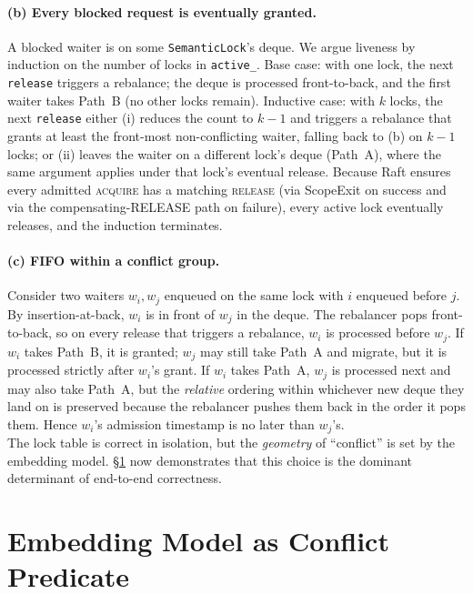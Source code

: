 \documentclass[sigconf]{acmart}
\begin{document}
\paragraph{\textbf{(b) Every blocked request is eventually granted.}}
A blocked waiter is on some \texttt{SemanticLock}'s deque. We argue
liveness by induction on the number of locks in \texttt{active\_}.
Base case: with one lock, the next \texttt{release} triggers a
rebalance; the deque is processed front-to-back, and the first waiter
takes Path~B (no other locks remain). Inductive case: with $k$ locks,
the next \texttt{release} either (i) reduces the count to $k-1$ and
triggers a rebalance that grants at least the front-most non-conflicting
waiter, falling back to (b) on $k-1$ locks; or (ii) leaves the waiter
on a different lock's deque (Path~A), where the same argument applies
under that lock's eventual release. Because Raft ensures every
admitted \textsc{acquire} has a matching \textsc{release} (via
ScopeExit on success and via the compensating-RELEASE path on failure),
every active lock eventually releases, and the induction terminates.

\paragraph{\textbf{(c) FIFO within a conflict group.}}
Consider two waiters $w_i, w_j$ enqueued on the same lock with $i$
enqueued before $j$. By insertion-at-back, $w_i$ is in front of $w_j$
in the deque. The rebalancer pops front-to-back, so on every release
that triggers a rebalance, $w_i$ is processed before $w_j$. If $w_i$
takes Path~B, it is granted; $w_j$ may still take Path~A and migrate,
but it is processed strictly after $w_i$'s grant. If $w_i$ takes
Path~A, $w_j$ is processed next and may also take Path~A, but the
\emph{relative} ordering within whichever new deque they land on is
preserved because the rebalancer pushes them back in the order it pops
them. Hence $w_i$'s admission timestamp is no later than $w_j$'s.
\\

The lock table is correct in isolation, but the \emph{geometry} of
``conflict'' is set by the embedding model. \S\ref{sec:embedding} now
demonstrates that this choice is the dominant determinant of
end-to-end correctness.

\section{Embedding Model as Conflict Predicate}
\label{sec:embedding}
\end{document}
